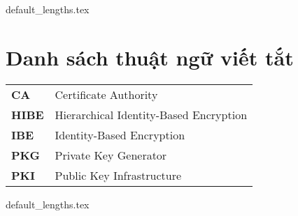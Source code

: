 \documentclass[class=report, crop=false]{standalone}
\begin{document}
	{default_lengths.tex}
	\baselineskip
	\chapter*{Danh sách thuật ngữ viết tắt}
	\begin{tabu}{>{\large\bfseries}p{2cm} >{\large}X[l]}
		CA		&	Certificate Authority						\\
		HIBE	&	Hierarchical Identity-Based Encryption 		\\
		IBE		&	Identity-Based Encryption 					\\
		PKG		&	Private Key Generator						\\
		PKI		&	Public Key Infrastructure					\\

	\end{tabu}
	\newpage
	{default_lengths.tex}
\end{document}
